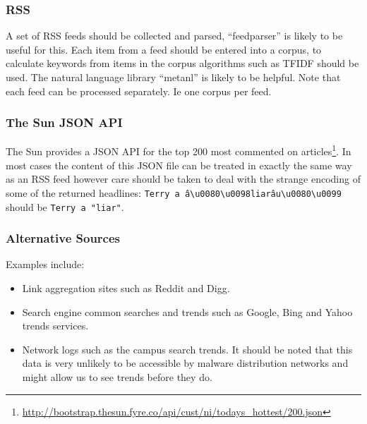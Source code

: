 \subsubsection{RSS}
A set of RSS feeds should be collected and parsed, ``feedparser'' is likely to be useful for this.  Each item from a feed should be entered into a corpus, to calculate keywords from items in the corpus algorithms such as TFIDF should be used. The natural language library ``metanl'' is likely to be helpful. Note that each feed can be processed separately. Ie one corpus per feed.

\subsubsection{The Sun JSON API}
The Sun provides a JSON API for the top 200 most commented on articles\footnote{\url{http://bootstrap.thesun.fyre.co/api/cust/ni/todays_hottest/200.json}}. In most cases the content of this JSON file can be treated in exactly the same way as an RSS feed however care should be taken to deal with the strange encoding of some of the returned headlines: \verb`Terry a â\u0080\u0098liarâu\u0080\u0099` should be \verb`Terry a "liar"`.

\subsubsection{Alternative Sources}
Examples include:
\begin{itemize}
    \item Link aggregation sites such as Reddit and Digg.
    \item Search engine common searches and trends such as Google, Bing and Yahoo trends services.
    \item Network logs such as the campus search trends. It should be noted that this data is very unlikely to be accessible by malware distribution networks and might allow us to see trends before they do.
\end{itemize}

